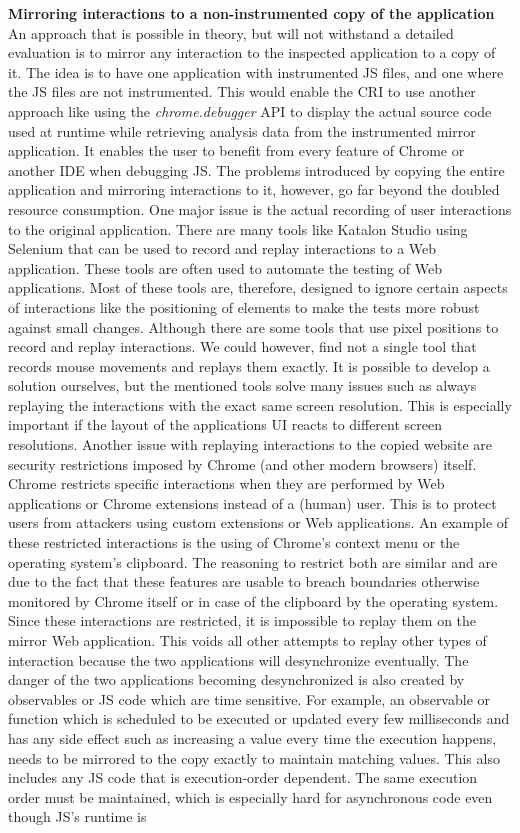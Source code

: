 \textbf{Mirroring interactions to a non-instrumented copy of the application}\\
An approach that is possible in theory, but will not withstand a detailed evaluation is to mirror any interaction to the inspected application to a copy of it. The idea is to have one application with instrumented JS files, and one where the JS files are not instrumented. This would enable the CRI to use another approach like using the \emph{chrome.debugger} API to display the actual source code used at runtime while retrieving analysis data from the instrumented mirror application. It enables the user to benefit from every feature of Chrome or another IDE when debugging JS. The problems introduced by copying the entire application and mirroring interactions to it, however, go far beyond the doubled resource consumption. One major issue is the actual recording of user interactions to the original application. There are many tools like Katalon Studio \cite{Katalon} using Selenium \cite{Selenium} that can be used to record and replay interactions to a Web application. These tools are often used to automate the testing of Web applications. Most of these tools are, therefore, designed to ignore certain aspects of interactions like the positioning of elements to make the tests more robust against small changes. Although there are some tools that use pixel positions to record and replay interactions. We could however, find not a single tool that records mouse movements and replays them exactly. It is possible to develop a solution ourselves, but the mentioned tools solve many issues such as always replaying the interactions with the exact same screen resolution. This is especially important if the layout of the applications UI reacts to different screen resolutions. Another issue with replaying interactions to the copied website are security restrictions imposed by Chrome (and other modern browsers) itself. Chrome restricts specific interactions when they are performed by Web applications or Chrome extensions instead of a (human) user. This is to protect users from attackers using custom extensions or Web applications. An example of these restricted interactions is the using of Chrome's context menu or the operating system's clipboard. The reasoning to restrict both are similar and are due to the fact that these features are usable to breach boundaries otherwise monitored by Chrome itself or in case of the clipboard by the operating system. Since these interactions are restricted, it is impossible to replay them on the mirror Web application. This voids all other attempts to replay other types of interaction because the two applications will desynchronize eventually. The danger of the two applications becoming desynchronized is also created by observables or JS code which are time sensitive. For example, an observable or function which is scheduled to be executed or updated every few milliseconds and has any side effect such as increasing a value every time the execution happens, needs to be mirrored to the copy exactly to maintain matching values. This also includes any JS code that is execution-order dependent. The same execution order must be maintained, which is especially hard for asynchronous code even though JS's runtime is 